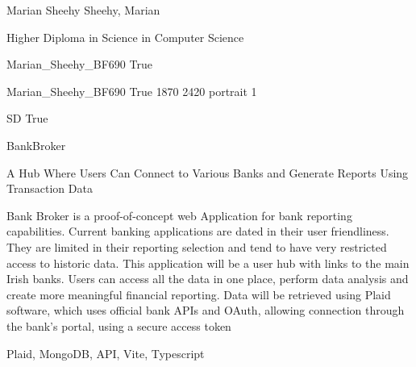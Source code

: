 \documentclass[twoside]{report}
\begin{document}
\begingroup{}\relax



\def\Key{Marian_Sheehy_BF690}

{Marian Sheehy}
{Sheehy, Marian}

{Higher Diploma in Science in Computer Science}

{Marian_Sheehy_BF690}
{True}

{Marian_Sheehy_BF690}
{True}
{1870}
{2420}
{portrait}
{1}

{SD}
{True}

{BankBroker}

{A Hub Where Users Can Connect to Various Banks and Generate Reports Using Transaction Data}

{Bank Broker is a proof-of-concept web Application for bank reporting capabilities. Current banking applications are dated in their user friendliness. They are limited in their reporting selection and tend to have very restricted access to historic data. This application will be a user hub with links to the main Irish banks. Users can access all the data in one place, perform data analysis and create more meaningful financial reporting. Data will be retrieved using Plaid software, which uses official bank APIs and OAuth, allowing connection through the bank's portal, using a secure access token}

{Plaid, MongoDB, API, Vite, Typescript}
\end{document}
